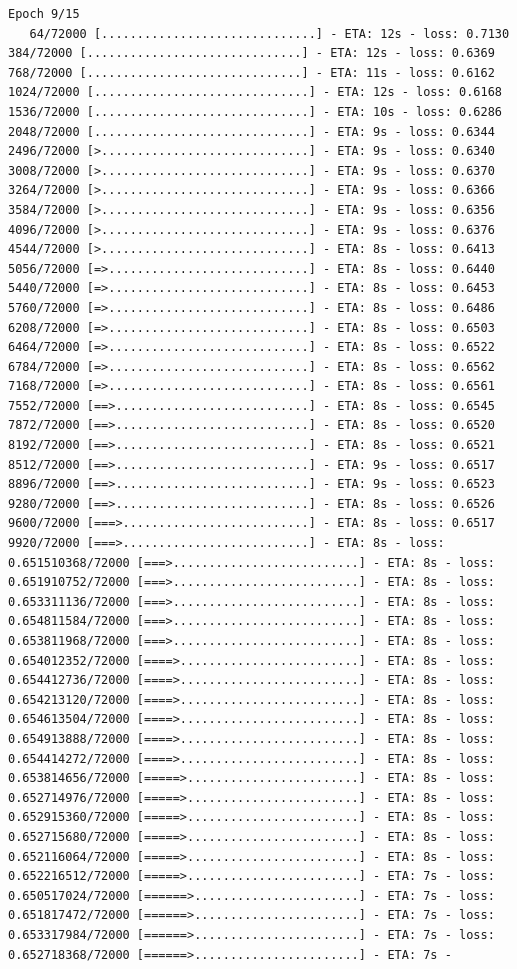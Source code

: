 \documentclass[12pt,fleqn]{article}\usepackage{../../common}
\begin{document}
\begin{verbatim}
Epoch 9/15
   64/72000 [..............................] - ETA: 12s - loss: 0.7130  384/72000 [..............................] - ETA: 12s - loss: 0.6369  768/72000 [..............................] - ETA: 11s - loss: 0.6162 1024/72000 [..............................] - ETA: 12s - loss: 0.6168 1536/72000 [..............................] - ETA: 10s - loss: 0.6286 2048/72000 [..............................] - ETA: 9s - loss: 0.6344  2496/72000 [>.............................] - ETA: 9s - loss: 0.6340 3008/72000 [>.............................] - ETA: 9s - loss: 0.6370 3264/72000 [>.............................] - ETA: 9s - loss: 0.6366 3584/72000 [>.............................] - ETA: 9s - loss: 0.6356 4096/72000 [>.............................] - ETA: 9s - loss: 0.6376 4544/72000 [>.............................] - ETA: 8s - loss: 0.6413 5056/72000 [=>............................] - ETA: 8s - loss: 0.6440 5440/72000 [=>............................] - ETA: 8s - loss: 0.6453 5760/72000 [=>............................] - ETA: 8s - loss: 0.6486 6208/72000 [=>............................] - ETA: 8s - loss: 0.6503 6464/72000 [=>............................] - ETA: 8s - loss: 0.6522 6784/72000 [=>............................] - ETA: 8s - loss: 0.6562 7168/72000 [=>............................] - ETA: 8s - loss: 0.6561 7552/72000 [==>...........................] - ETA: 8s - loss: 0.6545 7872/72000 [==>...........................] - ETA: 8s - loss: 0.6520 8192/72000 [==>...........................] - ETA: 8s - loss: 0.6521 8512/72000 [==>...........................] - ETA: 9s - loss: 0.6517 8896/72000 [==>...........................] - ETA: 9s - loss: 0.6523 9280/72000 [==>...........................] - ETA: 8s - loss: 0.6526 9600/72000 [===>..........................] - ETA: 8s - loss: 0.6517 9920/72000 [===>..........................] - ETA: 8s - loss: 0.651510368/72000 [===>..........................] - ETA: 8s - loss: 0.651910752/72000 [===>..........................] - ETA: 8s - loss: 0.653311136/72000 [===>..........................] - ETA: 8s - loss: 0.654811584/72000 [===>..........................] - ETA: 8s - loss: 0.653811968/72000 [===>..........................] - ETA: 8s - loss: 0.654012352/72000 [====>.........................] - ETA: 8s - loss: 0.654412736/72000 [====>.........................] - ETA: 8s - loss: 0.654213120/72000 [====>.........................] - ETA: 8s - loss: 0.654613504/72000 [====>.........................] - ETA: 8s - loss: 0.654913888/72000 [====>.........................] - ETA: 8s - loss: 0.654414272/72000 [====>.........................] - ETA: 8s - loss: 0.653814656/72000 [=====>........................] - ETA: 8s - loss: 0.652714976/72000 [=====>........................] - ETA: 8s - loss: 0.652915360/72000 [=====>........................] - ETA: 8s - loss: 0.652715680/72000 [=====>........................] - ETA: 8s - loss: 0.652116064/72000 [=====>........................] - ETA: 8s - loss: 0.652216512/72000 [=====>........................] - ETA: 7s - loss: 0.650517024/72000 [======>.......................] - ETA: 7s - loss: 0.651817472/72000 [======>.......................] - ETA: 7s - loss: 0.653317984/72000 [======>.......................] - ETA: 7s - loss: 0.652718368/72000 [======>.......................] - ETA: 7s - 
\end{verbatim}
\end{document}
